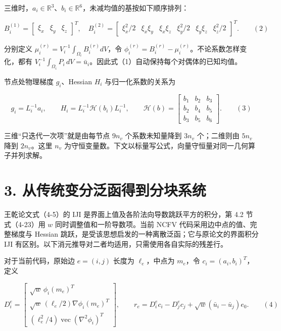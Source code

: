 \documentclass[
  11pt,
  a4paper,
]{article}
\begin{document}
三维时，\(a_i\in\mathbb R^3\)、\(b_i\in\mathbb R^6\)，未减均值的基按如下顺序排列：

\[
B_i^{(1)}=\begin{bmatrix}\xi_x&\xi_y&\xi_z\end{bmatrix}^T,
\quad B_i^{(2)}=\begin{bmatrix}\xi_x^2/2&\xi_x\xi_y&\xi_x\xi_z&\xi_y^2/2&\xi_y\xi_z&\xi_z^2/2\end{bmatrix}^T. \qquad(2)
\]

分别定义 \(\mu_i^{(r)}=V_i^{-1}\int_{\Omega_i}B_i^{(r)}dV\)，令
\(\phi_i^{(r)}=B_i^{(r)}-\mu_i^{(r)}\)。不论系数怎样变化，都有
\(V_i^{-1}\int_{\Omega_i}P_i\,dV=\bar u_i\)。因此式（1）自动保持每个对偶体的已知均值。

节点处物理梯度 \(g_i\)、Hessian \(H_i\) 与归一化系数的关系为

\[
g_i=L_i^{-1}a_i,\qquad
H_i=L_i^{-1}\mathcal H(b_i)L_i^{-1},\qquad
\mathcal H(b)=\begin{bmatrix}b_1&b_2&b_3\\b_2&b_4&b_5\\b_3&b_5&b_6\end{bmatrix}. \qquad(3)
\]

三维``只迭代一次项''就是由每节点 \(9n_v\) 个系数未知量降到 \(3n_v\)
个；二维则由 \(5n_v\) 降到 \(2n_v\)。这里 \(n_v\)
为守恒变量数。下文以标量写公式，向量守恒量对同一几何算子并列求解。

\hypertarget{ux4eceux4f20ux7edfux53d8ux5206ux6cdbux51fdux5f97ux5230ux5206ux5757ux7cfbux7edf}{%
\section{3.
从传统变分泛函得到分块系统}\label{ux4eceux4f20ux7edfux53d8ux5206ux6cdbux51fdux5f97ux5230ux5206ux5757ux7cfbux7edf}}

王乾论文式（4-5）的 IJI 是界面上值及各阶法向导数跳跃平方的积分，第 4.2
节式（4-23）用 \(w\) 同时调整值和一阶导数项。当前 NCFV
代码采用边中点的值、完整梯度与 Hessian
跳跃，是受该思想启发的一种离散泛函；它与原论文的界面积分 IJI
有区别。以下消元推导对二者均适用，只需使用各自实际的残差行。

对于当前代码，原始边 \(e=(i,j)\) 长度为 \(\ell_e\)，中点为 \(m_e\)，令
\(c_i=(a_i,b_i)^T\)，定义

\[
D_i^e=\begin{bmatrix}
\sqrt w\,\phi_i(m_e)^T\\
\sqrt w\,(\ell_e/2)\nabla\phi_i(m_e)^T\\
(\ell_e^2/4)\operatorname{vec}(\nabla^2\phi_i)^T
\end{bmatrix},\qquad
r_e=D_i^e c_i-D_j^e c_j+\sqrt w(\bar u_i-\bar u_j)e_0. \qquad(4)
\]
\end{document}
